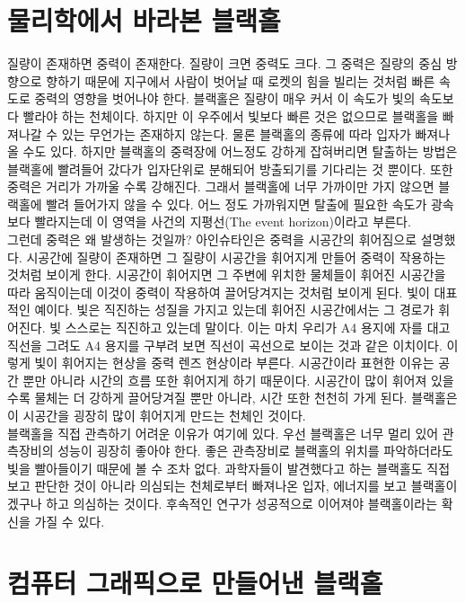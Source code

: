 \documentclass[
    aps,
    reprint,
    superscriptaddress,
    ]{revtex4-2}
\begin{document}
\section{물리학에서 바라본 블랙홀}
질량이 존재하면 중력이 존재한다. 질량이 크면 중력도 크다. 그 중력은 질량의 중심 방향으로 향하기 때문에 
지구에서 사람이 벗어날 때 로켓의 힘을 빌리는 것처럼 빠른 속도로 중력의 영향을 벗어나야 한다. 
블랙홀은 질량이 매우 커서 이 속도가 빛의 속도보다 빨라야 하는 천체이다. 하지만 이 우주에서 빛보다 빠른 
것은 없으므로 블랙홀을 빠져나갈 수 있는 무언가는 존재하지 않는다. 물론 블랙홀의 종류에 따라 입자가 빠져나올
수도 있다. 하지만 블랙홀의 중력장에 어느정도 강하게 잡혀버리면 탈출하는 방법은 블랙홀에 빨려들어 갔다가
입자단위로 분해되어 방출되기를 기다리는 것 뿐이다.
또한 중력은 거리가 가까울 수록 강해진다. 그래서 블랙홀에 너무 가까이만 가지 않으면 블랙홀에 빨려 들어가지
않을 수 있다. 어느 정도 가까워지면 탈출에 필요한 속도가 광속보다 빨라지는데 이 영역을 사건의 지평선(The
event horizon)이라고 부른다. \\
그런데 중력은 왜 발생하는 것일까? 아인슈타인은 중력을 시공간의 휘어짐으로 설명했다. 
시공간에 질량이 존재하면 그 질량이 시공간을 휘어지게 만들어 중력이 작용하는 것처럼 보이게 한다.
시공간이 휘어지면 그 주변에 위치한 물체들이 휘어진 시공간을 따라 움직이는데 이것이 중력이 작용하여
끌어당겨지는 것처럼 보이게 된다. 빛이 대표적인 예이다. 빛은 직진하는 성질을 가지고 있는데 휘어진 시공간에서는
그 경로가 휘어진다. 빛 스스로는 직진하고 있는데 말이다. 이는 마치 우리가 A4 용지에 자를 대고 직선을 그려도
A4 용지를 구부려 보면 직선이 곡선으로 보이는 것과 같은 이치이다. 이렇게 빛이 휘어지는 현상을 중력 렌즈 
현상이라 부른다.
시공간이라 표현한 이유는 공간 뿐만 아니라 시간의 흐름 또한 휘어지게
하기 때문이다. 시공간이 많이 휘어져 있을 수록 물체는 더 강하게 끌어당겨질 뿐만 아니라, 시간 또한 천천히
가게 된다. 블랙홀은 이 시공간을 굉장히 많이 휘어지게 만드는 천체인 것이다.  \\
블랙홀을 직접 관측하기 어려운 이유가 여기에 있다. 우선 블랙홀은 너무 멀리 있어 관측장비의 성능이 굉장히 
좋아야 한다. 좋은 관측장비로 블랙홀의 위치를 파악하더라도 빛을 빨아들이기 때문에 볼 수 조차 없다.
과학자들이 발견했다고 하는 블랙홀도 직접 보고 판단한 것이 아니라 의심되는 천체로부터 빠져나온 입자, 
에너지를 보고 블랙홀이겠구나 하고 의심하는 것이다. 후속적인 연구가 성공적으로 이어져야 블랙홀이라는 확신을
가질 수 있다.

\section{컴퓨터 그래픽으로 만들어낸 블랙홀}

\nocite{*}





\end{document}
